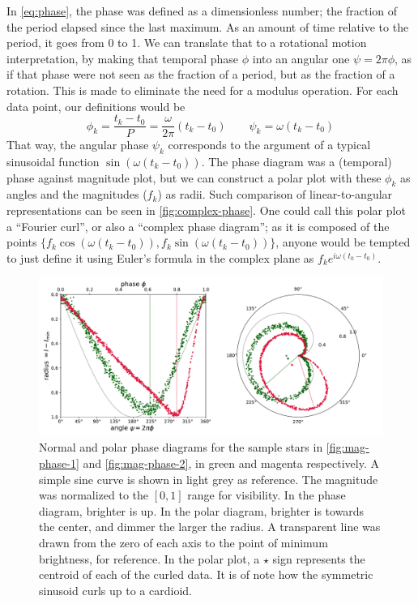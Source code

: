 	In \autoref{eq:phase}, the phase was defined as a dimensionless number; the fraction of the period elapsed since the last maximum.
	As an amount of time relative to the period, it goes from 0 to 1.
	We can translate that to a rotational motion interpretation, by making that temporal phase $\phi$ into an angular one $\psi=2\pi \phi$,
	as if that phase were not seen as the fraction of a period, but as the fraction of a rotation.
	This is made to eliminate the need for a modulus operation. For each data point, our definitions would be
	$$
	\phi_k = \frac{t_k-t_0}{P} = \frac{\omega}{2\pi}(t_k-t_0) \qquad \psi_k = \omega(t_k-t_0)
	$$
	That way, the angular phase $\psi_k$ corresponds to the argument of a typical sinusoidal function $\sin(\omega(t_k-t_0))$.
	The phase diagram was a (temporal) phase against magnitude plot, but we can construct a polar plot with these $\phi_k$ as angles and the magnitudes ($f_k$) as radii.
	Such comparison of linear-to-angular representations can be seen in \autoref{fig:complex-phase}.
	One could call this polar plot a \enquote{Fourier curl}, or also a \enquote{complex phase diagram};
	as it is composed of the points $\{f_k \cos(\omega(t_k-t_0)),f_k \sin(\omega(t_k-t_0))\}$, 
	anyone would be tempted to just define it using Euler's formula in the complex plane as $f_k e^{i \omega (t_k-t_0)}$.
	
	\begin{figure}
		\centering
		\includegraphics[width=\textwidth]{img/complex_phase.pdf}
		\caption[Complex phase diagram: Fourier curl]{
			Normal and polar phase diagrams for the sample stars in \autoref{fig:mag-phase-1} and \ref{fig:mag-phase-2}, 
			in green and magenta respectively. A simple sine curve is shown in light grey as reference.
			The magnitude was normalized to the $[0,1]$ range for visibility. 
			In the phase diagram, brighter is up. In the polar diagram, brighter is towards the center, and dimmer the larger the radius.
			A transparent line was drawn from the zero of each axis to the point of minimum brightness, for reference.
			In the polar plot, a $\star$ sign represents the centroid of each of the curled data.
			It is of note how the symmetric sinusoid curls up to a cardioid.
		}
		\label{fig:complex-phase}
	\end{figure}
	
